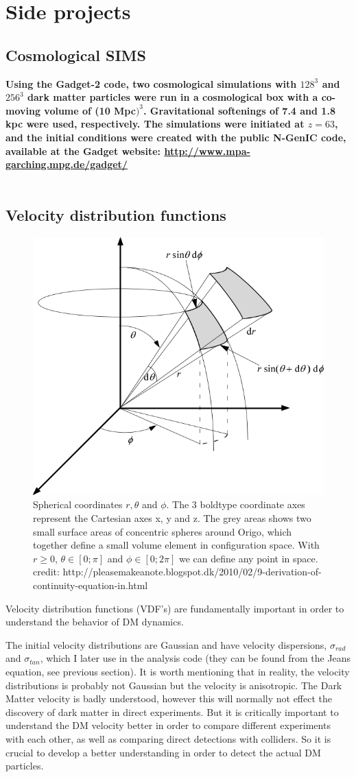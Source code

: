 \section{Side projects}

\subsection{Cosmological SIMS}
\textbf{Using the Gadget-2 code, two cosmological simulations with $128^3$ and $256^3$ dark matter particles were run in a cosmological box with a co-moving volume of (10 Mpc$)^3$. Gravitational softenings of 7.4 and 1.8 kpc were used, respectively. The simulations were initiated at $z=63$, and the initial conditions were created with the public N-GenIC code, available at the Gadget website: 
\url{http://www.mpa-garching.mpg.de/gadget/}} \\ \\


\subsection{Velocity distribution functions}
\begin{figure}
\centering
\includegraphics[width=1.0 cm]{img/control-volume-spherical.png}
\caption{Spherical coordinates $ r, \theta $ and $ \phi$. The 3 boldtype coordinate axes represent the Cartesian axes x, y and z. The grey areas shows two small surface areas of concentric spheres around Origo, which together define a small volume element in configuration space. With $ r \geq 0 $, $ \theta \in [0 ; \pi] $ and $ \phi \in [0 ; 2\pi] $ we can define any point in space. credit: http://pleasemakeanote.blogspot.dk/2010/02/9-derivation-of-continuity-equation-in.html}
\label{fig:test}
\end{figure}

Velocity distribution functions (VDF's) are fundamentally important in order to understand the behavior of DM dynamics.

The initial velocity distributions are Gaussian and have velocity dispersions,  $ \sigma_{rad}$  and $\sigma_{tan} $, which I later use in the analysis code (they can be found from the Jeans equation, see previous section). It is worth mentioning that in reality, the velocity distributions is probably not Gaussian but the velocity is anisotropic. The Dark Matter velocity is badly understood, however this will normally not effect the discovery of dark matter in direct experiments. But it is critically important to understand the DM velocity better in order to compare different experiments with each other, as well as comparing direct detections with colliders. So it is crucial to develop a better understanding in order to detect the actual DM particles. 


